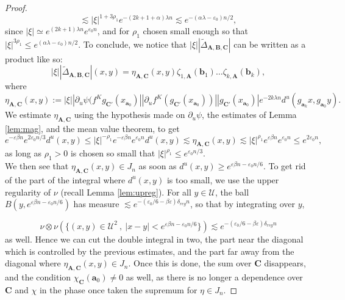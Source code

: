 \documentclass[a4paper]{article}
\theoremstyle{definition}
\begin{document}
\begin{proof}
$$ \lesssim |\xi|^{1+3\rho_1} e^{-(2k+1+\alpha) \lambda n} \lesssim e^{-(\alpha \lambda - \varepsilon_0)n/2},$$
since $|\xi| \simeq  e^{(2k+1) \lambda n} e^{\varepsilon_0 n} $, and for $\rho_1$ chosen small enough so that $|\xi|^{3 \rho_1} \leq e^{(\alpha \lambda - \varepsilon_0) n/2}$. 
To conclude, we notice that $ |\xi| |\tilde{\Delta}_{\mathbf{A},\mathbf{B},\mathbf{C}}|$ can be written as a product like so:
$$ |\xi| |\tilde{\Delta}_{\mathbf{A},\mathbf{B},\mathbf{C}}|(x,y) =  \eta_{\mathbf{A},\mathbf{C}}(x,y)  \zeta_{1,\mathbf{A}}(\mathbf{b}_1) \dots  \zeta_{k,\mathbf{A}}(\mathbf{b}_k),  $$
where $$ \eta_{\mathbf{A},\mathbf{C}}(x,y) := |\xi| |\partial_u \psi(  f^K g_{\mathbf{C}'}(x_{\mathbf{a}_0} )| |\partial_u f^K(g_{\mathbf{C}'} (x_{\mathbf{a}_0}) )| |g_{\mathbf{C}'}(x_{\mathbf{a}_0})| e^{-2 k \lambda n }d^u(g_{\mathbf{a}_k}x,g_{\mathbf{a}_0}y). $$
We estimate $\eta_{\mathbf{A},\mathbf{C}}$ using the hypothesis made on $\partial_u \psi$, the estimates of Lemma \ref{lem:mag}, and the mean value theorem, to get
$$ e^{-\varepsilon \beta n} e^{2 \varepsilon_0 n/3} d^u(x,y) \leq |\xi|^{-\rho_1} e^{-\varepsilon \beta n} e^{\varepsilon_0 n} d^u(x,y) \lesssim \eta_{\mathbf{A},\mathbf{C}}(x,y)  \lesssim |\xi|^{\rho_1} e^{\varepsilon \beta n} e^{\varepsilon_0 n} \leq e^{2 \varepsilon_0 n} ,$$
as long as $\rho_1>0$ is chosen so small that $|\xi|^{\rho_1} \leq e^{\varepsilon_0 n/3}$. \\

We then see that $\eta_{\mathbf{A},\mathbf{C}}(x,y) \in J_n$ as soon as $d^u(x,y) \geq e^{\varepsilon \beta n - \varepsilon_0 n/6}$. To get rid of the part of the integral where $d^u(x,y)$ is too small, we use the upper regularity of $\nu$ (recall Lemma \ref{lem:upreg}). For all $y \in \mathcal{U}$, the ball $B(y, e^{\varepsilon \beta n - \varepsilon_0 n /6} )$ has measure $ \lesssim e^{-( \varepsilon_0/6  - \beta \varepsilon) \delta_{reg} n} $, so that by integrating over $y$,

$$ \nu \otimes \nu \left( \{ (x,y) \in \mathcal{U}^2 \ , \ |x-y|<  e^{\varepsilon \beta n - \varepsilon_0 n/6} \} \right) \lesssim e^{-( \varepsilon_0/6  - \beta \varepsilon) \delta_{reg} n} $$
as well. Hence we can cut the double integral in two, the part near the diagonal which is controlled by the previous estimates, and the part far away from the diagonal where $\eta_{\mathbf{A},\mathbf{C}}(x,y) \in J_n$. Once this is done, the sum over $\mathbf{C}$ disappears, and the condition $\chi_{\mathbf{C}}(\mathbf{a}_0) \neq 0$ as well, as there is no longer a dependence over $\mathbf{C}$ and $\chi$ in the phase once taken the supremum for $\eta \in J_n$. \end{proof}
\end{document}
